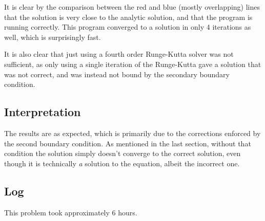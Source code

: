 \documentclass[10pt,letter]{article}
\begin{document}
It is clear by the comparison between the red and blue (mostly overlapping) lines that the solution is very close to the analytic solution, and that the program is running correctly. This program converged to a solution in only 4 iterations as well, which is surprisingly fast.

It is also clear that just using a fourth order Runge-Kutta solver was not sufficient, as only using a single iteration of the Runge-Kutta gave a solution that was not correct, and was instead not bound by the secondary boundary condition.
\subsection{Interpretation}

The results are as expected, which is primarily due to the corrections enforced by the second boundary condition. As mentioned in the last section, without that condition the solution simply doesn't converge to the correct solution, even though it is technically \emph{a} solution to the equation, albeit the incorrect one.
 
\subsection{Log}

This problem took approximately 6 hours.
\end{document}
